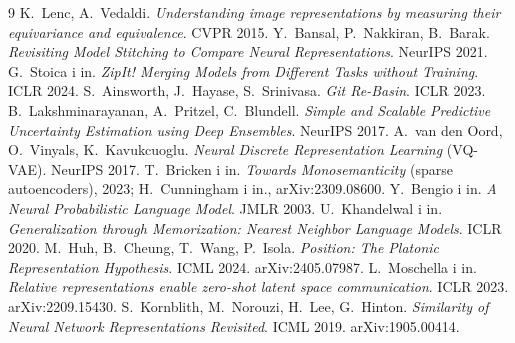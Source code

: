 \documentclass[11pt]{article}
\begin{document}
\begin{thebibliography}{9}
 K.~Lenc, A.~Vedaldi. \emph{Understanding image representations by measuring their equivariance and equivalence}. CVPR 2015.
 Y.~Bansal, P.~Nakkiran, B.~Barak. \emph{Revisiting Model Stitching to Compare Neural Representations}. NeurIPS 2021.
 G.~Stoica i in. \emph{ZipIt! Merging Models from Different Tasks without Training}. ICLR 2024.
 S.~Ainsworth, J.~Hayase, S.~Srinivasa. \emph{Git Re-Basin}. ICLR 2023.
 B.~Lakshminarayanan, A.~Pritzel, C.~Blundell. \emph{Simple and Scalable Predictive Uncertainty Estimation using Deep Ensembles}. NeurIPS 2017.
 A.~van den Oord, O.~Vinyals, K.~Kavukcuoglu. \emph{Neural Discrete Representation Learning} (VQ-VAE). NeurIPS 2017.
 T.~Bricken i in. \emph{Towards Monosemanticity} (sparse autoencoders), 2023; H.~Cunningham i in., arXiv:2309.08600.
 Y.~Bengio i in. \emph{A Neural Probabilistic Language Model}. JMLR 2003.
 U.~Khandelwal i in. \emph{Generalization through Memorization: Nearest Neighbor Language Models}. ICLR 2020.
 M.~Huh, B.~Cheung, T.~Wang, P.~Isola. \emph{Position: The Platonic Representation Hypothesis}. ICML 2024. arXiv:2405.07987.
 L.~Moschella i in. \emph{Relative representations enable zero-shot latent space communication}. ICLR 2023. arXiv:2209.15430.
 S.~Kornblith, M.~Norouzi, H.~Lee, G.~Hinton. \emph{Similarity of Neural Network Representations Revisited}. ICML 2019. arXiv:1905.00414.
\end{thebibliography}
\end{document}
